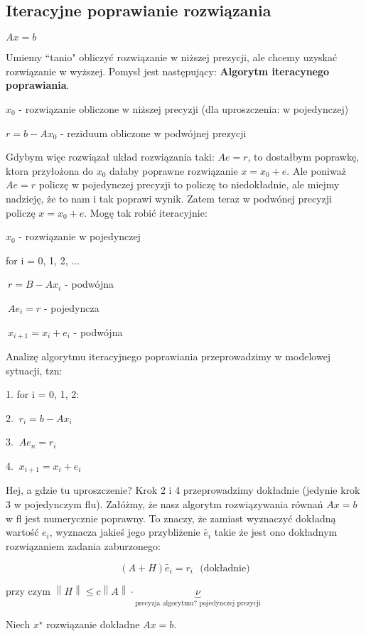 \documentclass[hidelinks,a4paper]{article}
\newcommand{\norm}[1]{\left\lVert#1\right\rVert}
\begin{document}
\subsection{Iteracyjne poprawianie rozwiązania}

$Ax = b$

Umiemy ``tanio" obliczyć rozwiązanie w niższej prezycji, ale chcemy uzyskać rozwiązanie w wyższej. Pomysł jest następujący: \textbf{Algorytm iteracynego poprawiania}.

$x_0$ - rozwiązanie obliczone w niższej precyzji (dla uproszczenia: w pojedynczej)

$r = b-Ax_0$ - reziduum obliczone w podwójnej prezycji

Gdybym więc rozwiązał układ rozwiązania taki: $Ae = r$, to dostałbym poprawkę, ktora przyłożona do $x_0$ dałaby poprawne rozwiązanie $x = x_0 + e$. Ale poniważ $Ae = r$ policzę w pojedynczej precyzji to policzę to niedokładnie, ale miejmy nadzieję, że to nam i tak poprawi wynik. Zatem teraz w podwónej precyzji policzę $x = x_0 + e$. Mogę tak robić iteracyjnie:

$x_0$ - rozwiązanie w pojedynczej

for i = 0, 1, 2, ...

$\ r = B-Ax_i$ - podwójna

$\ Ae_i = r$ - pojedyncza

$\ x_{i+1} = x_i + e_i$ - podwójna
	


Analizę algorytmu iteracyjnego poprawiania przeprowadzimy w modelowej sytuacji, tzn:

1. for i = 0, 1, 2:

2. $\ r_i = b - Ax_i$

3. $\ Ae_n = r_i$

4. $\ x_{i+1} = x_i + e_i$
	
Hej, a gdzie tu uproszczenie? Krok 2 i 4 przeprowadzimy dokładnie (jedynie krok 3 w pojedynczym flu). Załóżmy, że nasz algorytm rozwiązywania równań $Ax = b$ w fl jest numerycznie poprawny. To znaczy, że zamiast wyznaczyć dokładną wartość $e_i$, wyznacza jakieś jego przybliżenie $\tilde{e_i}$ takie że jest ono dokładnym rozwiązaniem zadania zaburzonego:

\[
	(A + H)\tilde{e_i} = r_i \ \ \ \textrm{(dokładnie)}
\]

przy czym $\norm{H} \leq c \norm{A} \cdot \underbrace{\nu}_{\textrm{precyzja algorytmu? pojedynczej prezycji}}$

Niech $x^\star$ rozwiązanie dokładne $Ax = b$.
\end{document}
